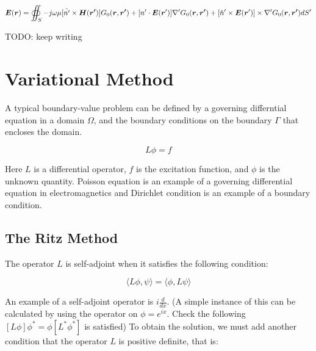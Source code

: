 \documentclass[a4paper,12pt]{report}
\begin{document}
\begin{equation}
  \boldsymbol{E}(\boldsymbol{r}) = \oiint_S{-j\omega\mu[\hat{n'} \\
  \times \boldsymbol{H}(\boldsymbol{r'})]G_0(\boldsymbol{r}, \boldsymbol{r'}) \\
  + [n'\cdot\boldsymbol{E}(\boldsymbol{r}')]\nabla'G_0(\boldsymbol{r}, \boldsymbol{r'}) \\
  + [\hat{n}' \times \boldsymbol{E}(\boldsymbol{r}')] \\
  \times \nabla'G_0(\boldsymbol{r}, \boldsymbol{r'})}dS'
\end{equation}

TODO: keep writing

\section{Variational Method}

A typical boundary-value problem can be defined by a
governing differntial equation in a domain $\Omega$,
and the boundary conditions on the boundary $\Gamma$ that encloses the domain.

\begin{equation} \label{eq:general_boundary_value_problem}
  L\phi = f
\end{equation}

Here $L$ is a differential operator, $f$ is the excitation function,
and $\phi$ is the unknown quantity.
Poisson equation is an example of a governing differential equation in electromagnetics
and Dirichlet condition is an example of a boundary condition.

\subsection{The Ritz Method}

The operator $L$ is self-adjoint when it satisfies the following condition:

\begin{equation}\label{eq:boundary_problem_differential_equation}
  \langle L\phi, \psi \rangle = \langle\phi, L\psi\rangle
\end{equation}

An example of a self-adjoint operator is $i\frac{d}{dx}$.
(A simple instance of this can be calculated by using the operator
on $\phi = e^{ix}$.
Check the following $[L\phi]\phi^*=\phi [L^*\phi^*]$ is satisfied)
To obtain the solution,
we must add another condition that the operator $L$ is positive definite,
that is:
\end{document}
